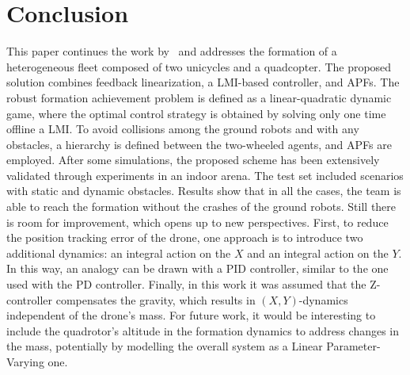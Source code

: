 \documentclass{ifacconf}
\begin{document}
\section{Conclusion}
\label{sec:conclusion}
This paper continues the work by~\cite{Morando2025SOSE}
and addresses the formation of a heterogeneous fleet composed 
of two unicycles and a quadcopter.
The proposed solution combines feedback linearization,
a LMI-based controller, and APFs.
The robust formation achievement problem is defined as 
a linear-quadratic dynamic game, where the optimal control 
strategy is obtained by solving only one time offline a LMI.
To avoid collisions among the ground robots and with any
obstacles, a hierarchy is defined between the two-wheeled agents, 
and APFs are employed.
After some simulations, the proposed scheme has  been extensively validated 
through experiments in an indoor arena.
The test set included scenarios with static and dynamic obstacles.
Results show that in all the cases, the team is able to reach 
the formation without the crashes of the ground robots.
Still there is room for improvement, which opens up to new perspectives.
First, to reduce the position tracking error of the drone, one approach  
is to introduce two additional dynamics: an integral 
action on the $X$ and an integral action on the $Y$.
In this way, an analogy can be drawn with a PID controller, similar to the one
used with the PD controller.
Finally, in this work it was assumed that the Z-controller 
compensates the gravity, which results in $(X,Y)$-dynamics 
independent of the drone's mass.
For future work, it would be interesting to include 
the quadrotor's altitude in the formation dynamics 
to address changes in the mass, potentially 
by modelling the overall system as a Linear Parameter-Varying one.

\end{document}
